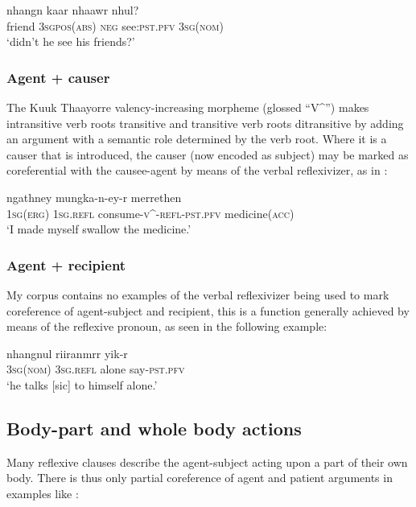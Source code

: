 \documentclass[output=paper]{langscibook}
\begin{document}
\ea 
    \label{ex:Gaby:20}
      {nhangn}  {kaar}  {nhaawr}  {nhul?}\\
     friend  \textsc{3sg}\textsc{pos}(\textsc{abs)}  \textsc{neg}  see:\textsc{pst.pfv}  \textsc{3sg}\textsc{(nom)}\\
    \glt ‘didn't he see his friends?’ \citep[65]{Hall1972} 
    \z

\subsubsection{Agent + causer}\label{sec:Gaby:4.2.3}
The Kuuk Thaayorre valency-increasing morpheme (glossed “V\^{}”) makes intransitive verb roots transitive and transitive verb roots ditransitive by adding an argument with a semantic role determined by the verb root. Where it is a causer that is introduced, the causer (now encoded as subject) may be marked as coreferential with the causee-agent by means of the verbal reflexivizer, as in :

\ea 
    \label{ex:Gaby:21}
      {ngathney}  {mungka-n-ey-r}   {merrethen}\\
    \textsc{1sg}(\textsc{erg})  \textsc{1sg}.\textsc{refl}  consume-\textsc{v}\^{}-\textsc{refl}{}-\textsc{pst.pfv}  medicine(\textsc{acc})\\
    \glt ‘I made myself swallow the medicine.’ \citep[392]{Hall1972}
    \z

  
\subsubsection{Agent + recipient}
\label{sec:Gaby:4.2.4}
My corpus contains no examples of the verbal reflexivizer being used to mark coreference of agent-subject and recipient, this is a function generally achieved by means of the reflexive pronoun, as seen in the following example:

\ea 
    \label{ex:Gaby:22}
      {nhangnul}  {riiranmrr}  {yik-r}\\
    \textsc{3sg}(\textsc{nom})  \textsc{3sg}.\textsc{refl}  alone  say-\textsc{pst.pfv}\\
    \glt ‘he talks [sic] to himself alone.’ \citep[503]{Hall1972}
    \z

 
\subsection{Body-part and whole body actions}
\label{sec:Gaby:4.3}
Many reflexive clauses describe the agent-subject acting upon a part of their own body. There is thus only partial coreference of agent and patient arguments in examples like :
\end{document}
